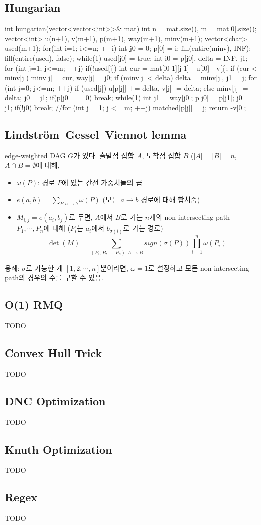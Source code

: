 \subsection{Hungarian}
\begin{cpp}
int hungarian(vector<vector<int>>& mat){
  int n = mat.size(), m = mat[0].size();
  vector<int> u(n+1), v(m+1), p(m+1), way(m+1), minv(m+1);
  vector<char> used(m+1);
  for(int i=1; i<=n; ++i) {
    int j0 = 0; p[0] = i;
    fill(entire(minv), INF);
    fill(entire(used), false);
    while(1){
      used[j0] = true;
      int i0 = p[j0], delta = INF, j1;
      for (int j=1; j<=m; ++j) if(!used[j]) {
        int cur = mat[i0-1][j-1] - u[i0] - v[j];
        if (cur < minv[j]) minv[j] = cur, way[j] = j0;
        if (minv[j] < delta) delta = minv[j], j1 = j;
      }
      for (int j=0; j<=m; ++j) {
        if (used[j]) u[p[j]] += delta, v[j] -= delta;
        else minv[j] -= delta;
      }
      j0 = j1;
      if(p[j0] == 0) break;
    }
    while(1){
      int j1 = way[j0];
      p[j0] = p[j1]; j0 = j1;
      if(!j0) break;
    }
  }
  //for (int j = 1; j <= m; ++j) matched[p[j]] = j;
  return -v[0];
}
\end{cpp}

\subsection{Lindström–Gessel–Viennot lemma}

edge-weighted DAG $G$가 있다. 출발점 집합 $A$, 도착점 집합 $B$ ($|A| = |B| = n$, $A \cap B = \emptyset$에 대해, 

\begin{itemize}
    \item $\omega(P)$: 경로 $P$에 있는 간선 가중치들의 곱
    \item $e(a, b) = \sum_{P:a \rightarrow b} \omega(P)$ (모든 $a \rightarrow b$ 경로에 대해 합쳐줌)
    \item $M_{i,j} = e(a_{i}, b_{j})$로 두면, $A$에서 $B$로 가는 $n$개의 non-intersecting path $P_{1}, \cdots, P_{n}$에 대해 ($P_i$는 $a_i$에서 $b_{\sigma(i)}$로 가는 경로)
    $$\det(M) = \sum_{(P_1, P_2, \cdots, P_n) : A \rightarrow B} sign(\sigma(P)) \prod_{i=1}^{n} \omega(P_{i})$$
\end{itemize}

용례: $\sigma$로 가능한 게 $[1, 2, \cdots, n]$뿐이라면, $\omega = 1$로 설정하고 모든 non-intersecting path의 경우의 수를 구할 수 있음.

\subsection{O(1) RMQ}
TODO

\subsection{Convex Hull Trick}
TODO

\subsection{DNC Optimization}
TODO

\subsection{Knuth Optimization}
TODO

\subsection{Regex}
TODO